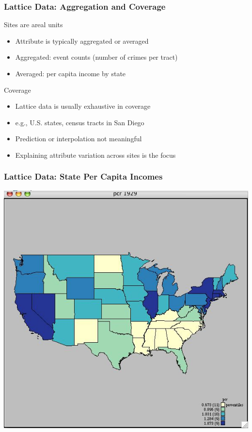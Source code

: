 \documentclass[nototal]{beamer}
\begin{document}
\begin{frame}[<+->]
  \frametitle{Lattice Data: Aggregation and Coverage}
  \begin{block}{Sites are areal units}
    \begin{itemize}
      \item Attribute is typically aggregated or averaged
      \item Aggregated: event counts (number of crimes per tract)
      \item Averaged: per capita income by state
    \end{itemize}
   \end{block}
\begin{block}{Coverage}
    \begin{itemize}
      \item Lattice data is usually exhaustive in coverage
      \item e.g., U.S. states, census tracts in San Diego
      \item Prediction or interpolation not meaningful
      \item Explaining attribute variation across sites is the focus
    \end{itemize}
   \end{block}
 \end{frame}
\begin{frame}
    \frametitle{Lattice Data: State Per Capita Incomes}
    \begin{center}
      \includegraphics[width=.65\linewidth]{lattice}
    \end{center}
  \end{frame}
\end{document}
